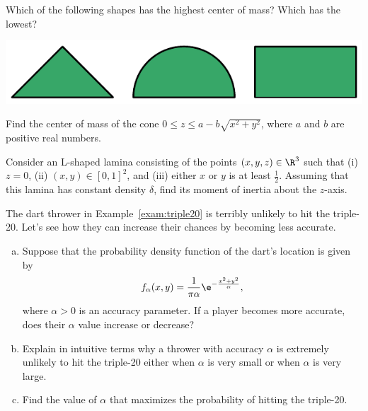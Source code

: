\documentclass{watsonbook}
\begin{document}
\begin{aexercise} 
  Which of the following shapes has the highest center of mass? Which
  has the lowest? 
  \begin{center}
    \includegraphics{exercisefigures/centerofmassshapes} 
  \end{center}
\end{aexercise}

\begin{aexercise}
  Find the center of mass of the cone $0 \leq z \leq a - b\sqrt{x^2 +
    y^2}$, where $a$ and $b$ are positive real numbers. 
\end{aexercise}

\begin{aexercise} 
  Consider an L-shaped lamina consisting of the points
  $(x,y,z) \in \R^3$ such that (i) $z = 0$, (ii) $(x,y) \in [0,1]^2$, and
  (iii) either $x$ or $y$ is at least $\frac{1}{2}$. Assuming that
  this lamina has constant density $\delta$, find its moment of
  inertia about the $z$-axis. 
\end{aexercise}

\begin{aexercise}
  The dart thrower in Example~\ref{exam:triple20} is terribly unlikely
  to hit the triple-20. Let's see how they can increase their chances
  by becoming less accurate.

  \begin{enumerate}[(a),topsep=6pt,leftmargin=12pt,itemsep=6pt]
  \item \label{part:whichway} Suppose that the probability density
  function of the dart's location is given by
  \[
    f_\alpha(x,y) = \frac{1}{\pi\alpha} \e^{-\frac{x^2+y^2}{\alpha}},
  \]
  where $\alpha >0$ is an accuracy parameter. If a player becomes more
  accurate, does their $\alpha$ value increase or decrease? 

  \item \label{part:unlikely} Explain in intuitive terms why a
  thrower with accuracy $\alpha$ is extremely unlikely to hit the
  triple-20 either when $\alpha$ is very small or when $\alpha$ is
  very large.

  \item  \label{part:maximizer} Find the value of $\alpha$ that
    maximizes the probability of hitting the triple-20.
  \end{enumerate}
\end{aexercise}
\end{document}
